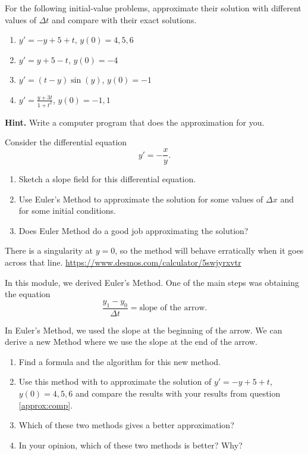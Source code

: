 \begin{exercises}
	
	\begin{problist}
	
	\prob \label{approx:comp}For the following initial-value problems, approximate their solution with different values of $\Delta t$ and compare with their exact solutions. 
	\begin{enumerate}
		\item $y'=-y+5+t$, $y(0) = 4,5,6$
		\item $y'=y+5-t$, $y(0) = -4$
		\item $y'=(t-y)\sin(y)$, $y(0)=-1$
		\item $\displaystyle y'=\frac{y+3t}{1+t^2}$, $y(0)=-1,1$
	\end{enumerate}
	
	\textbf{Hint. } Write a computer program that does the approximation for you.
	
	
	\prob Consider the differential equation
	$$ y'=-\frac{x}{y}.$$
	\begin{enumerate}
		\item Sketch a slope field for this differential equation.
		\item Use Euler's Method to approximate the solution for some values of $\Delta x$ and for some initial conditions.
		\item Does Euler Method do a good job approximating the solution?
	\end{enumerate}
	
	\begin{annotation}
	\begin{Goals}
		There is a singularity at $y=0$, so the method will behave erratically when it goes across that line.
			\href{https://www.desmos.com/calculator/5swjyrxvtr}{https://www.desmos.com/calculator/5swjyrxvtr} \hfill {}
	\end{Goals}
	\end{annotation}
	
	
	
	
	\prob In this module, we derived Euler's Method. One of the main steps was obtaining the equation
	$$\frac{y_1-y_0}{\Delta t} = \text{slope of the arrow}.$$
	
	In Euler's Method, we used the slope at the beginning of the arrow. We can derive a new Method where we use the slope at the end of the arrow. 
	
	\begin{enumerate}
		\item Find a formula and the algorithm for this new method.
		\item Use this method with to approximate the solution of $y'=-y+5+t$, $y(0) = 4,5,6$ and compare the results with your results from question \ref{approx:comp}.
		\item Which of these two methods gives a better approximation?
		\item In your opinion, which of these two methods is better? Why?
	\end{enumerate}
	

\end{problist}
\end{exercises}
